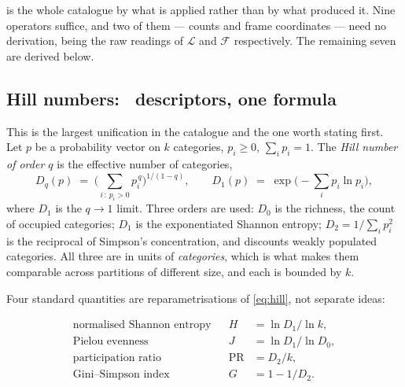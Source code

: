 \documentclass[11pt,a4paper]{article}
\newcommand{\obj}[1]{\ensuremath{\mathcal{#1}}}
\begin{document}
 is the whole catalogue by what is applied rather than by what produced it.
Nine operators suffice, and two of them --- counts and frame coordinates --- need no derivation,
being the raw readings of \obj{L} and \obj{F} respectively. The remaining seven are derived below.

\begin{table}[t]
\centering

\caption{The \nDesc\ descriptors by operator. Counts and shares dominate because the interface and
kinetics families are largely tallies; the interesting structure is in the smaller rows.}
\label{tab:operators}
\end{table}

\subsection{Hill numbers: \nOpHill\ descriptors, one formula}
\label{sec:hill}

This is the largest unification in the catalogue and the one worth stating first. Let $p$ be a
probability vector on $k$ categories, $p_i \ge 0$, $\sum_i p_i = 1$. The \emph{Hill number of order
$q$} \cite{Hill1973,Jost2006} is the effective number of categories,
%
\begin{equation}
D_q(p) \;=\; \Big( \sum_{i \,:\, p_i > 0} p_i^{\,q} \Big)^{1/(1-q)},
\qquad
D_1(p) \;=\; \exp\Big( - \sum_i p_i \ln p_i \Big),
\label{eq:hill}
\end{equation}
%
where $D_1$ is the $q \to 1$ limit. Three orders are used: $D_0$ is the richness, the count of
occupied categories; $D_1$ is the exponentiated Shannon entropy; $D_2 = 1/\sum_i p_i^2$ is the
reciprocal of Simpson's concentration, and discounts weakly populated categories. All three are in
units of \emph{categories}, which is what makes them comparable across partitions of different
size, and each is bounded by $k$.

Four standard quantities are reparametrisations of \cref{eq:hill}, not separate ideas:

\begin{align}
\text{normalised Shannon entropy} && H &= \ln D_1 / \ln k, \label{eq:shannon}\\
\text{Pielou evenness} && J &= \ln D_1 / \ln D_0, \label{eq:pielou}\\
\text{participation ratio} && \mathrm{PR} &= D_2 / k, \label{eq:pr}\\
\text{Gini--Simpson index} && G &= 1 - 1/D_2. \label{eq:gini}
\end{align}
\end{document}
